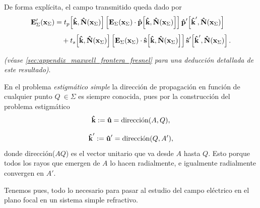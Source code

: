 De forma explícita, el campo transmitido queda dado por
\begin{equation}
  \begin{aligned}
  \vb{E}'_{\Sigma}(\vb x_\Sigma)
  &=
  t_p\!\left[
  \bm{\hat{\mathbf{k}}},\bm{\hat{\mathbf{N}}}(\vb x_\Sigma)
  \right]
  \left[
  \vb{E}_{\Sigma}(\vb x_\Sigma)\cdot
  \bm{\hat{\mathbf{p}}}\!\left[
  \bm{\hat{\mathbf{k}}},\bm{\hat{\mathbf{N}}}(\vb x_\Sigma)
  \right]
  \right]
  \bm{\hat{\mathbf{p}}}'\!\left[
  \bm{\hat{\mathbf{k}}}',\bm{\hat{\mathbf{N}}}(\vb x_\Sigma)
  \right]
  \\[4pt]
  &\quad+
  t_s\!\left[
  \bm{\hat{\mathbf{k}}},\bm{\hat{\mathbf{N}}}(\vb x_\Sigma)
  \right]
  \left[
  \vb{E}_{\Sigma}(\vb x_\Sigma)\cdot
  \bm{\hat{\mathbf{s}}}\!\left[
  \bm{\hat{\mathbf{k}}},\bm{\hat{\mathbf{N}}}(\vb x_\Sigma)
  \right]
  \right]
  \bm{\hat{\mathbf{s}}}'\!\left[
  \bm{\hat{\mathbf{k}}}',\bm{\hat{\mathbf{N}}}(\vb x_\Sigma)
  \right].
  \end{aligned}
  \label{eq:Transmited_E_field_in_Sigma}
\end{equation}

\textit{(véase \ref{sec:appendix_maxwell_frontera_fresnel} para una deducción detallada de este resultado)}.

En el problema \textit{estigmático simple} la dirección de propagación en función de cualquier punto $Q \ \in \Sigma$ es siempre conocida, pues por la construcción del problema estigmático
$$
\bm{\hat{\mathbf{k}}} := \bm{\hat{\mathbf{u}}} = \text{dirección}(A, Q),
$$

$$
\bm{\hat{\mathbf{k}}}':= \bm{\hat{\mathbf{u}}}' = \text{dirección}(Q, A'),
$$
donde dirección($AQ$) es el vector unitario que va desde $A$ hasta $Q$.
Esto porque todos los rayos que emergen de $A$ lo hacen radialmente, e igualmente radialmente convergen en $A'$.

Tenemos pues, todo lo necesario para pasar al estudio del campo eléctrico en el plano focal en un sistema simple refractivo.



